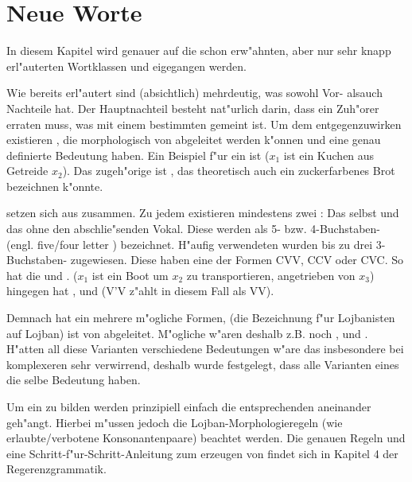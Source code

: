 \chapter{Neue Worte}
In diesem Kapitel wird genauer auf die schon erw"ahnten, aber nur sehr knapp erl"auterten Wortklassen  und  eigegangen
werden.

Wie bereits erl"autert sind  (absichtlich) mehrdeutig, was sowohl Vor- alsauch Nachteile hat. Der Hauptnachteil besteht nat"urlich
darin, dass ein Zuh"orer erraten muss, was mit einem bestimmten  gemeint ist. Um dem entgegenzuwirken existieren , die
morphologisch von  abgeleitet werden k"onnen und eine genau definierte Bedeutung haben. Ein Beispiel f"ur ein  ist
 ($x_1$ ist ein Kuchen aus Getreide $x_2$). Das zugeh"orige  ist , das theoretisch
auch ein zuckerfarbenes Brot bezeichnen k"onnte.

 setzen sich aus  zusammen. Zu jedem  existieren mindestens zwei : Das  selbst und das  ohne
den abschlie"senden Vokal. Diese  werden als 5- bzw. 4-Buchstaben- (engl. five/four letter ) bezeichnet. 
H"aufig verwendeten  wurden bis zu drei 3-Buchstaben- zugewiesen. Diese  haben eine der Formen CVV, CCV oder
CVC.
So hat  die   und .  ($x_1$ ist ein Boot um $x_2$ zu transportieren, angetrieben von $x_3$) hingegen hat ,  und  (V'V z"ahlt in diesem Fall als VV).

Demnach hat ein  mehrere m"ogliche Formen,  (die Bezeichnung f"ur Lojbanisten auf Lojban) ist von
 abgeleitet. M"ogliche  w"aren deshalb z.B. noch ,  und . H"atten all diese Varianten verschiedene Bedeutungen w"are das insbesondere bei komplexeren  sehr verwirrend, deshalb wurde festgelegt, dass alle Varianten eines  die selbe Bedeutung haben.

Um ein  zu bilden werden prinzipiell einfach die entsprechenden  aneinander geh"angt. Hierbei m"ussen
jedoch die Lojban-Morphologieregeln (wie erlaubte/verbotene Konsonantenpaare) beachtet werden. Die genauen Regeln und eine
Schritt-f"ur-Schritt-Anleitung zum erzeugen von  findet sich in Kapitel 4 der Regerenzgrammatik.

